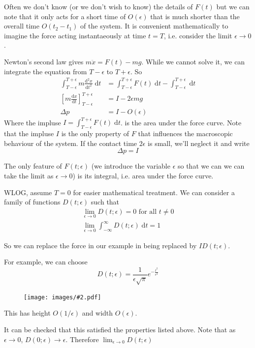 \documentclass[a4paper]{article}
\theoremstyle{definition}
\renewcommand{\d}{\mathrm{d}}
\newcommand{\img}[2][]{\begin{figure}[ht]\centering\texttt{[image: images/\#2.pdf]}\end{figure}}
\begin{document}
Often we don't know (or we don't wish to know) the details of $F(t)$ but we can note that it only acts for a short time of $O(\epsilon)$ that is much shorter than the overall time $O(t_2 - t_1)$ of the system. It is convenient mathematically to imagine the force acting instantaeously at time $t = T$, i.e. consider the limit $\epsilon\to 0$.

Newton's second law gives $m\ddot x = F(t) - mg$. While we cannot solve it, we can integrate the equation from $T - \epsilon$ to $T + \epsilon$. So 
\begin{align*}
  \int_{T - \epsilon}^{T + \epsilon} m\frac{\d ^2 x}{\d t^2}\;\d t &= \int_{T - \epsilon}^{T + \epsilon} F(t)\;\d t - \int_{T - \epsilon}^{T + \epsilon}\;\d t\\
  \left[ m\frac{\d x}{\d t}\right]^{T + \epsilon}_{T - \epsilon} &= I - 2\epsilon mg\\
  \Delta p &= I - O(\epsilon)
\end{align*}
Where the impluse $I = \int_{T - \epsilon}^{T + \epsilon} F(t) \;\d t$. is the area under the force curve. Note that the impluse $I$ is the only property of $F$ that influences the macroscopic behaviour of the system. If the contact time $2\epsilon$ is small, we'll neglect it and write 
\[
\Delta p = I
\]

The only feature of $F(t; \epsilon)$ (we introduce the variable $\epsilon$ so that we can we can take the limit as $\epsilon \to 0$) is its integral, i.e. area under the force curve.

WLOG, assume $T = 0$ for easier mathematical treatment. We can consider a family of functions $D(t; \epsilon)$ such that 
\begin{gather*}
\lim_{\epsilon\to 0} D(t; \epsilon) = 0 \text{ for all }t \not= 0\\
\lim_{\epsilon\to 0}\int_{-\infty}^\infty D(t; \epsilon) \;\d t = 1
\end{gather*}

So we can replace the force in our example in being replaced by $ID(t; \epsilon)$.

For example, we can choose 
\[
D(t; \epsilon) = \frac{1}{\epsilon\sqrt{\pi}}e^{-\frac{t^2}{\epsilon^2}}
\]
\img[width=250pt]{de_19}
This has height $O(1/\epsilon)$ and width $O(\epsilon)$.

It can be checked that this satisfied the properties listed above. Note that as $\epsilon \to 0$, $D(0; \epsilon)\to \epsilon$. Therefore $\displaystyle \lim_{\epsilon\to 0} D(t; \epsilon)$
\end{document}
